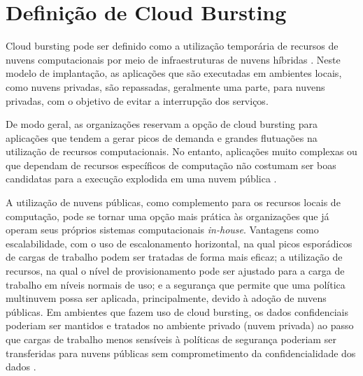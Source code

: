 \documentclass[tese,capa]{texufpel}
\begin{document}
\section{Definição de Cloud Bursting}

Cloud bursting pode ser definido como a utilização temporária de recursos de nuvens computacionais por meio de infraestruturas de nuvens híbridas \cite{Jigsaw2021}. Neste modelo de implantação, as aplicações que são executadas em ambientes locais, como nuvens privadas, são repassadas, geralmente uma parte, para nuvens privadas, com o objetivo de evitar a interrupção dos serviços.

De modo geral, as organizações reservam a opção de cloud bursting para aplicações que tendem a gerar picos de demanda e grandes flutuações na utilização de recursos computacionais. No entanto, aplicações muito complexas ou que dependam de recursos específicos de computação não costumam ser boas candidatas para a execução explodida em uma nuvem pública \cite{NetApp2020}.

A utilização de nuvens públicas, como complemento para os recursos locais de computação, pode se tornar uma opção mais prática às organizações que já operam seus próprios sistemas computacionais \emph{in-house}. Vantagens como escalabilidade, com o uso de escalonamento horizontal, na qual picos esporádicos de cargas de trabalho podem ser tratadas de forma mais eficaz; a utilização de recursos, na qual o nível de provisionamento pode ser ajustado para a carga de trabalho em níveis normais de uso; e a segurança que permite que uma política multinuvem possa ser aplicada, principalmente, devido à adoção de nuvens públicas. Em ambientes que fazem uso de cloud bursting, os dados confidenciais poderiam ser mantidos e tratados no ambiente privado (nuvem privada) ao passo que cargas de trabalho menos sensíveis à políticas de segurança poderiam ser transferidas para nuvens públicas sem comprometimento da confidencialidade dos dados \cite{leeCloudBurstingScheduler2017}.

\end{document}
